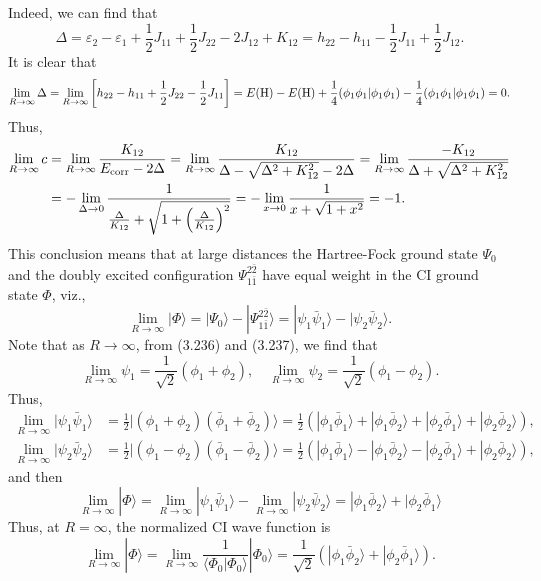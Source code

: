\documentclass[a4paper]{book}
\newcommand{\corr}{{\rm corr}}
\begin{document}
\begin{solution}
	Indeed, we can find that
	\[
		\Delta = \varepsilon_2 - \varepsilon_1 + \frac{1}{2} J_{11} + \frac{1}{2} J_{22} - 2J_{12} + K_{12} = h_{22} - h_{11} - \frac{1}{2} J_{11} + \frac{1}{2} J_{12}.
	\]
	It is clear that	
	\[
		\lim_{ R \rightarrow \infty} \Delta = \lim_{ R \rightarrow \infty} \left[ h_{22} - h_{11} + \frac{1}{2} J_{22} - \frac{1}{2} J_{11} \right] = E(\ce{H}) - E(\ce{H}) + \frac{1}{4} ( \phi_1 \phi_1 | \phi_1 \phi_1 ) - \frac{1}{4} ( \phi_1 \phi_1 | \phi_1 \phi_1 ) = 0.
	\]
	Thus,
	\begin{align*}
		\lim_{ R \rightarrow \infty } c &= \lim_{ R \rightarrow \infty } \frac{ K_{12} }{ E_\corr - 2\Delta } = \lim_{ R \rightarrow \infty } \frac{ K_{12} }{ \Delta - \sqrt{ \Delta^2 + K^2_{12} } - 2\Delta } = \lim_{ R \rightarrow \infty } \frac{ - K_{12} }{ \Delta + \sqrt{ \Delta^2 + K^2_{12} } } \\
		&= - \lim_{ \Delta \rightarrow 0 } \frac{ 1 }{ \frac{ \Delta }{ K_{12} } + \sqrt{ 1 + \left( \frac{ \Delta }{ K_{12} } \right)^2 } } = - \lim_{ x \rightarrow 0 } \frac{ 1 }{ x + \sqrt{ 1 + x^2 } } = -1.
	\end{align*}
	This conclusion means that at large distances the Hartree-Fock ground state $\Psi_0$ and the doubly excited configuration $\Psi^{2 \bar{2}}_{1 \bar{1}}$ have equal weight in the CI ground state $\Phi$, viz.,
	\[
		\lim_{ R \rightarrow \infty } | \Phi \rangle = | \Psi_0 \rangle - | \Psi^{2 \bar{2}}_{1 \bar{1}} \rangle = | \psi_1 \bar{\psi}_1 \rangle - | \psi_2 \bar{\psi}_2 \rangle.
	\]
	Note that as $R \rightarrow \infty$, from (3.236) and (3.237), we find that
	\[
		\lim_{ R \rightarrow \infty } \psi_1 = \frac{1}{ \sqrt{2} } ( \phi_1 + \phi_2 ) , \quad \lim_{ R \rightarrow \infty } \psi_2 = \frac{1}{ \sqrt{2} } ( \phi_1 - \phi_2 ).
	\]
	Thus,
	\begin{align*}
		\lim_{ R \rightarrow \infty } | \psi_1 \bar{\psi}_1 \rangle &= \frac{1}{2} | ( \phi_1 + \phi_2 ) ( \bar{\phi}_1 + \bar{\phi}_2 ) \rangle = \frac{1}{2} \left( | \phi_1 \bar{\phi}_1 \rangle + | \phi_1 \bar{\phi}_2 \rangle + | \phi_2 \bar{\phi}_1 \rangle + | \phi_2 \bar{\phi}_2 \rangle \right), \\
		\lim_{ R \rightarrow \infty } | \psi_2 \bar{\psi}_2 \rangle &= \frac{1}{ 2 } | ( \phi_1 - \phi_2 ) ( \bar{\phi}_1 - \bar{\phi}_2 ) \rangle = \frac{1}{2} \left( | \phi_1 \bar{\phi}_1 \rangle - | \phi_1 \bar{\phi}_2 \rangle - | \phi_2 \bar{\phi}_1 \rangle + | \phi_2 \bar{\phi}_2 \rangle \right),
	\end{align*}
	and then	
	\[
		\lim_{ R \rightarrow \infty } | \Phi \rangle = \lim_{ R \rightarrow \infty } | \psi_1 \bar{\psi}_1 \rangle - \lim_{ R \rightarrow \infty } | \psi_2 \bar{\psi}_2 \rangle = | \phi_1 \bar{\phi}_2 \rangle + | \phi_2 \bar{\phi}_1 \rangle
	\]
	Thus, at $R = \infty$, the normalized CI wave function is
	\begin{equation}
		\lim_{R \rightarrow \infty} | \Phi \rangle = \lim_{R \rightarrow \infty} \frac{1}{ \langle \Phi_0 | \Phi_0 \rangle } | \Phi_0 \rangle = \frac{1}{ \sqrt{2} } \left( | \phi_1 \bar{\phi}_2 \rangle + | \phi_2 \bar{\phi}_1 \rangle \right) .
	\end{equation}
	

\end{solution}
\end{document}
